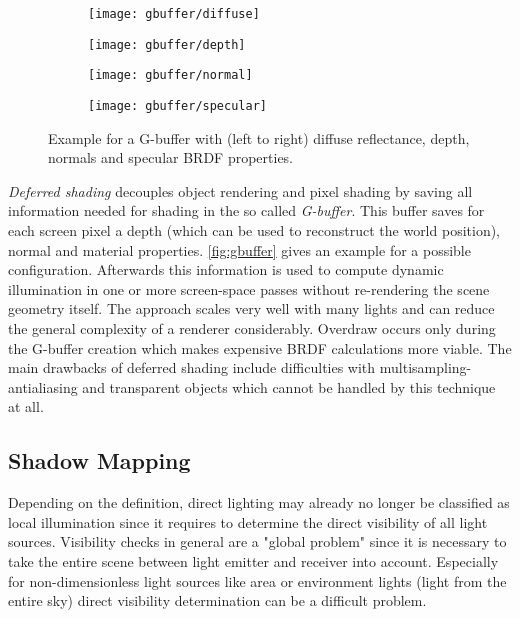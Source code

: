 \documentclass[thesis.tex]{subfiles}
\begin{document}
\begin{figure}[h]
\centering
\begin{subfigure}[b]{0.24\textwidth}
	\texttt{[image: gbuffer/diffuse]}
\end{subfigure}
\begin{subfigure}[b]{0.24\textwidth}
	\texttt{[image: gbuffer/depth]}
\end{subfigure}
\begin{subfigure}[b]{0.24\textwidth}
	\texttt{[image: gbuffer/normal]}
\end{subfigure}
\begin{subfigure}[b]{0.24\textwidth}
	\texttt{[image: gbuffer/specular]}
\end{subfigure}
\caption{Example for a G-buffer with (left to right) diffuse reflectance, depth, normals and specular BRDF properties.} \label{fig:gbuffer}
\end{figure}
\emph{Deferred shading} decouples object rendering and pixel shading by saving all information needed for shading in the so called \emph{G-buffer}.
This buffer saves for each screen pixel a depth (which can be used to reconstruct the world position), normal and material properties.
\autoref{fig:gbuffer} gives an example for a possible configuration.
Afterwards this information is used to compute dynamic illumination in one or more screen-space passes without re-rendering the scene geometry itself.
The approach scales very well with many lights and can reduce the general complexity of a renderer considerably.
Overdraw occurs only during the G-buffer creation which makes expensive BRDF calculations more viable.
The main drawbacks of deferred shading include difficulties with multisampling-antialiasing and transparent objects which cannot be handled by this technique at all.


\subsection{Shadow Mapping}
Depending on the definition, direct lighting may already no longer be classified as local illumination since it requires to determine the direct visibility of all light sources. 
Visibility checks in general are a "global problem" since it is necessary to take the entire scene between light emitter and receiver into account.
Especially for non-dimensionless light sources like area or environment lights (light from the entire sky) direct visibility determination can be a difficult problem.
\end{document}
